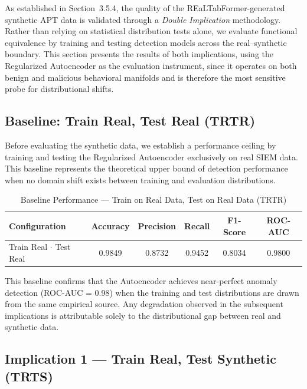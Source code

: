 As established in Section~3.5.4, the quality of the REaLTabFormer-generated synthetic APT data is validated through a \textit{Double Implication} methodology. Rather than relying on statistical distribution tests alone, we evaluate functional equivalence by training and testing detection models across the real--synthetic boundary. This section presents the results of both implications, using the Regularized Autoencoder as the evaluation instrument, since it operates on both benign and malicious behavioral manifolds and is therefore the most sensitive probe for distributional shifts.

\subsection{Baseline: Train Real, Test Real (TRTR)}

Before evaluating the synthetic data, we establish a performance ceiling by training and testing the Regularized Autoencoder exclusively on real SIEM data. This baseline represents the theoretical upper bound of detection performance when no domain shift exists between training and evaluation distributions.

\begin{table}[H]
    \centering
    \caption{Baseline Performance — Train on Real Data, Test on Real Data (TRTR)}
    \label{tab:trtr_baseline}
    \begin{tabular}{lccccc}
        \toprule
        \textbf{Configuration} & \textbf{Accuracy} & \textbf{Precision} & \textbf{Recall} & \textbf{F1-Score} & \textbf{ROC-AUC} \\
        \midrule
        Train Real $\cdot$ Test Real & 0.9849 & 0.8732 & 0.9452 & 0.8034 & 0.9800 \\
        \bottomrule
    \end{tabular}
\end{table}

This baseline confirms that the Autoencoder achieves near-perfect anomaly detection (ROC-AUC = 0.98) when the training and test distributions are drawn from the same empirical source. Any degradation observed in the subsequent implications is attributable solely to the distributional gap between real and synthetic data.

\subsection{Implication 1 — Train Real, Test Synthetic (TRTS)}

